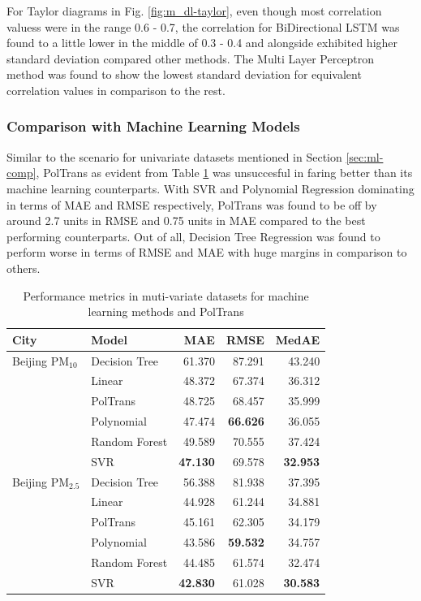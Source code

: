 \documentclass[10pt,journal]{IEEEtran}
\begin{document}
For Taylor diagrams in Fig. \ref{fig:m_dl-taylor}, even though most correlation valuess were in the range 0.6 - 0.7, the correlation for BiDirectional LSTM was found to a little lower in the middle of 0.3 - 0.4 and alongside exhibited higher standard deviation compared other methods. The Multi Layer Perceptron method was found to show the lowest standard deviation for equivalent correlation values  in comparison to the rest.

\subsubsection{Comparison with Machine Learning Models}

Similar to the scenario for univariate datasets mentioned in Section \ref{sec:ml-comp}, {PolTrans} as evident from Table \ref{tbl:m_ml-performance} was unsuccesful in faring better than its machine learning counterparts. With SVR and Polynomial Regression dominating in terms of MAE and RMSE respectively, {PolTrans}  was found to be off by around 2.7 units in RMSE and 0.75 units in MAE compared to the best performing counterparts. Out of all, Decision Tree Regression was found to perform worse in terms of RMSE and MAE with huge margins in comparison to others.

\begin{table}[h]
\small
\centering
\tabcolsep=0.16cm
\caption{Performance metrics in muti-variate datasets for machine learning methods and PolTrans}
\label{tbl:m_ml-performance}
\begin{tabular}{llrrr}
\toprule
City & Model &   MAE &    RMSE &   MedAE \\
\midrule
Beijing PM${_{10}}$ & Decision Tree &  61.370 &  87.291 &  43.240 \\
              & Linear &  48.372 &  67.374 &  36.312 \\
              & PolTrans &  48.725 &  68.457 &  35.999 \\
              & Polynomial &  47.474 &  \textbf{66.626} &  36.055 \\
              & Random Forest &  49.589 &  70.555 &  37.424 \\
              & SVR &  \textbf{47.130} &  69.578 &  \textbf{32.953} \\
Beijing PM${_{2.5}}$ & Decision Tree &  56.388 &  81.938 &  37.395 \\
              & Linear &  44.928 &  61.244 &  34.881 \\
              & PolTrans &  45.161 &  62.305 &  34.179 \\
              & Polynomial &  43.586 &  \textbf{59.532} &  34.757 \\
              & Random Forest &  44.485 &  61.574 &  32.474 \\
              & SVR &  \textbf{42.830} &  61.028 &  \textbf{30.583} \\
\bottomrule
\end{tabular}
\end{table}
\end{document}
